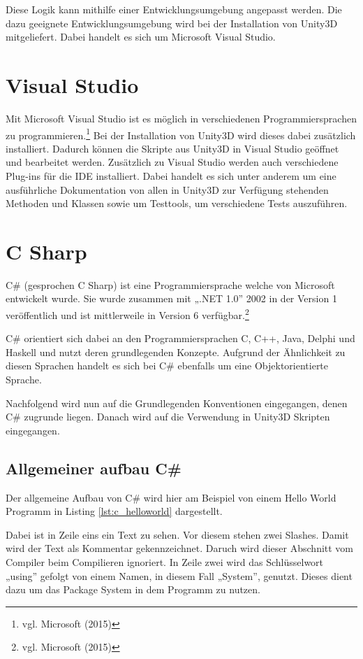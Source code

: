 Diese Logik kann mithilfe einer Entwicklungsumgebung angepasst werden. Die dazu geeignete Entwicklungsumgebung wird bei der Installation von Unity3D mitgeliefert. Dabei handelt es sich um Microsoft Visual Studio.

\section{Visual Studio}

Mit Microsoft Visual Studio ist es möglich in verschiedenen Programmiersprachen zu programmieren.\footnote{vgl. Microsoft \cite{microsoft1} (2015)} 
Bei der Installation von Unity3D wird dieses dabei zusätzlich installiert. Dadurch können die Skripte aus Unity3D in Visual Studio geöffnet und bearbeitet werden. Zusätzlich zu Visual Studio werden auch verschiedene Plug-ins für die IDE installiert. Dabei handelt es sich unter anderem um eine ausführliche Dokumentation von allen in Unity3D zur Verfügung stehenden Methoden und Klassen sowie um Testtools, um verschiedene Tests auszuführen. 

\section{C Sharp}

C\# (gesprochen C Sharp) ist eine Programmiersprache welche von Microsoft entwickelt wurde. Sie wurde zusammen mit „.NET 1.0” 2002 in der Version 1 veröffentlich und ist mittlerweile in Version 6 verfügbar.\footnote{vgl. Microsoft \cite{microsoft2} (2015)} 

C\# orientiert sich dabei an den Programmiersprachen C, C++, Java, Delphi und Haskell und nutzt deren grundlegenden Konzepte. Aufgrund der Ähnlichkeit zu diesen Sprachen handelt es sich bei C\# ebenfalls um eine Objektorientierte Sprache. 

Nachfolgend wird nun auf die Grundlegenden Konventionen eingegangen, denen C\# zugrunde liegen. Danach wird auf die Verwendung in Unity3D Skripten eingegangen.

\subsection{Allgemeiner aufbau C\#}

Der allgemeine Aufbau von C\# wird hier am Beispiel von einem Hello World Programm in Listing \ref{lst:c_helloworld} dargestellt. 

Dabei ist in Zeile eins ein Text zu sehen. Vor diesem stehen zwei Slashes. Damit wird der Text als Kommentar gekennzeichnet. Daruch wird dieser Abschnitt vom Compiler beim Compilieren ignoriert. In Zeile zwei wird das Schlüsselwort „using” gefolgt von einem Namen, in diesem Fall „System”, genutzt. Dieses dient dazu um das Package System in dem Programm zu nutzen.
\newline

